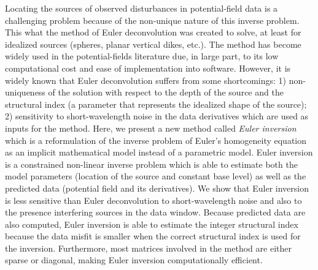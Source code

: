 Locating the sources of observed disturbances in potential-field data is a challenging problem because of the non-unique nature of this inverse problem. 
This what the method of Euler deconvolution was created to solve, at least for idealized sources (spheres, planar vertical dikes, etc.).
The method has become widely used in the potential-fields literature due, in large part, to its low computational cost and ease of implementation into software.
However, it is widely known that Euler deconvolution suffers from some shortcomings: 1) non-uniqueness of the solution with respect to the depth of the source and the structural index (a parameter that represents the idealized shape of the source); 2) sensitivity to short-wavelength noise in the data derivatives which are used as inputs for the method.
Here, we present a new method called \textit{Euler inversion} which is a reformulation of the inverse problem of Euler's homogeneity equation as an implicit mathematical model instead of a parametric model.
Euler inversion is a constrained non-linear inverse problem which is able to estimate both the model parameters (location of the source and constant base level) as well as the predicted data (potential field and its derivatives).
We show that Euler inversion is less sensitive than Euler deconvolution to short-wavelength noise and also to the presence interfering sources in the data window.
Because predicted data are also computed, Euler inversion is able to estimate the integer structural index because the data misfit is smaller when the correct structural index is used for the inversion.
Furthermore, most matrices involved in the method are either sparse or diagonal, making Euler inversion computationally efficient.